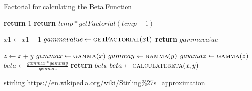 \documentclass{report}
\begin{document}
\begin{algorithm}
\caption{Factorial for calculating the Beta Function}
\begin{algorithmic}[1]

   
    \State \textbf{return} $1$
    \Else
    \State \textbf{return} $temp * getFactorial(temp - 1)$
    \EndIf
    \EndProcedure
\Statex


    \State $x1 \leftarrow x1-1$
    \State $gammavalue \leftarrow \Call{getFactorial}{x1}$
    \State \textbf{return} $gammavalue$
    \EndProcedure
\Statex

    \State $z \leftarrow x+y$
    \State $gammax \leftarrow \Call{gamma}{x}$
    \State $gammay \leftarrow \Call{gamma}{y}$
    \State $gammaz \leftarrow \Call{gamma}{z}$
    \State $beta \leftarrow \frac{gammax * gammay}{gammaz}$
    \State \textbf{return} $beta$
    \EndProcedure
\Statex
\State $beta \leftarrow \Call{calculatebeta}{x,y} $
\end{algorithmic}
\end{algorithm}


\begin{thebibliography}{9}
\item{stirling}
\url{https://en.wikipedia.org/wiki/Stirling%27s_approximation}

\end{thebibliography}
\end{document}
